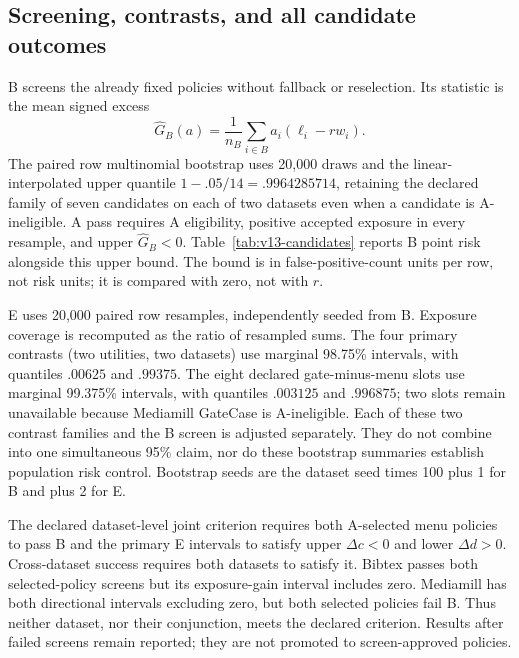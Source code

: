 \subsection{Screening, contrasts, and all candidate outcomes}
\label{sec:v13-inference}
B screens the already fixed policies without fallback or reselection. Its statistic is the mean signed excess
\begin{equation}
 \widehat G_B(a)=\frac{1}{n_B}\sum_{i\in B}a_i(\ell_i-rw_i).
 \label{eq:v13-signed-screen}
\end{equation}
The paired row multinomial bootstrap uses 20,000 draws and the linear-interpolated upper quantile $1-.05/14=.9964285714$, retaining the declared family of seven candidates on each of two datasets even when a candidate is A-ineligible. A pass requires A eligibility, positive accepted exposure in every resample, and upper $\widehat G_B<0$. Table~\ref{tab:v13-candidates} reports B point risk alongside this upper bound. The bound is in false-positive-count units per row, not risk units; it is compared with zero, not with $r$.

E uses 20,000 paired row resamples, independently seeded from B. Exposure coverage is recomputed as the ratio of resampled sums. The four primary contrasts (two utilities, two datasets) use marginal 98.75\% intervals, with quantiles $.00625$ and $.99375$. The eight declared gate-minus-menu slots use marginal 99.375\% intervals, with quantiles $.003125$ and $.996875$; two slots remain unavailable because Mediamill GateCase is A-ineligible. Each of these two contrast families and the B screen is adjusted separately. They do not combine into one simultaneous 95\% claim, nor do these bootstrap summaries establish population risk control. Bootstrap seeds are the dataset seed times 100 plus 1 for B and plus 2 for E.

The declared dataset-level joint criterion requires both A-selected menu policies to pass B and the primary E intervals to satisfy upper $\Delta c<0$ and lower $\Delta d>0$. Cross-dataset success requires both datasets to satisfy it. Bibtex passes both selected-policy screens but its exposure-gain interval includes zero. Mediamill has both directional intervals excluding zero, but both selected policies fail B. Thus neither dataset, nor their conjunction, meets the declared criterion. Results after failed screens remain reported; they are not promoted to screen-approved policies.

